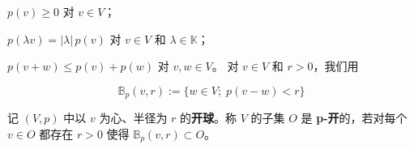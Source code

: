 \begin{subitems}
\item

$ p(v) \ge 0 $ 对 $ v \in V $；

\item

$ p(\lambda v) = |\lambda| \, p(v) $ 对 $ v \in V $ 和 $ \lambda \in \mathbb{K} $；

\item

$ p(v + w) \le p(v) + p(w) $ 对 $ v, w \in V $。
对 $ v \in V $ 和 $ r > 0 $，我们用

\[
\mathbb{B}_p(v,r) := \{ w \in V ; \; p(v - w) < r \}
\]

记 $ (V,p) $ 中以 $ v $ 为心、半径为 $ r $ 的\textbf{开球}。称 $ V $ 的子集 $ O $ 是 \textbf{p-开}的，若对每个 $ v \in O $ 都存在 $ r > 0 $ 使得 $ \mathbb{B}_p(v,r) \subset O $。

\end{subitems}

